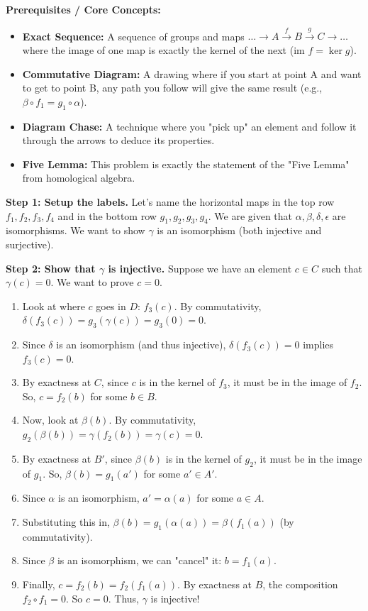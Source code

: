 \begin{solution}
\textbf{Prerequisites / Core Concepts:}
\begin{itemize}
    \item \textbf{Exact Sequence:} A sequence of groups and maps $\dots \to A \xrightarrow{f} B \xrightarrow{g} C \to \dots$ where the image of one map is exactly the kernel of the next ($\text{im } f = \ker g$).
    \item \textbf{Commutative Diagram:} A drawing where if you start at point A and want to get to point B, any path you follow will give the same result (e.g., $\beta \circ f_1 = g_1 \circ \alpha$).
    \item \textbf{Diagram Chase:} A technique where you "pick up" an element and follow it through the arrows to deduce its properties.
    \item \textbf{Five Lemma:} This problem is exactly the statement of the "Five Lemma" from homological algebra.
\end{itemize}

\textbf{Step 1: Setup the labels.}
Let's name the horizontal maps in the top row $f_1, f_2, f_3, f_4$ and in the bottom row $g_1, g_2, g_3, g_4$. We are given that $\alpha, \beta, \delta, \epsilon$ are isomorphisms. We want to show $\gamma$ is an isomorphism (both injective and surjective).

\textbf{Step 2: Show that $\gamma$ is injective.}
Suppose we have an element $c \in C$ such that $\gamma(c) = 0$. We want to prove $c = 0$.
\begin{enumerate}
    \item Look at where $c$ goes in $D$: $f_3(c)$. By commutativity, $\delta(f_3(c)) = g_3(\gamma(c)) = g_3(0) = 0$.
    \item Since $\delta$ is an isomorphism (and thus injective), $\delta(f_3(c)) = 0$ implies $f_3(c) = 0$.
    \item By exactness at $C$, since $c$ is in the kernel of $f_3$, it must be in the image of $f_2$. So, $c = f_2(b)$ for some $b \in B$.
    \item Now, look at $\beta(b)$. By commutativity, $g_2(\beta(b)) = \gamma(f_2(b)) = \gamma(c) = 0$.
    \item By exactness at $B'$, since $\beta(b)$ is in the kernel of $g_2$, it must be in the image of $g_1$. So, $\beta(b) = g_1(a')$ for some $a' \in A'$.
    \item Since $\alpha$ is an isomorphism, $a' = \alpha(a)$ for some $a \in A$.
    \item Substituting this in, $\beta(b) = g_1(\alpha(a)) = \beta(f_1(a))$ (by commutativity).
    \item Since $\beta$ is an isomorphism, we can "cancel" it: $b = f_1(a)$.
    \item Finally, $c = f_2(b) = f_2(f_1(a))$. By exactness at $B$, the composition $f_2 \circ f_1 = 0$. So $c = 0$. Thus, $\gamma$ is injective!
\end{enumerate}


\end{solution}
